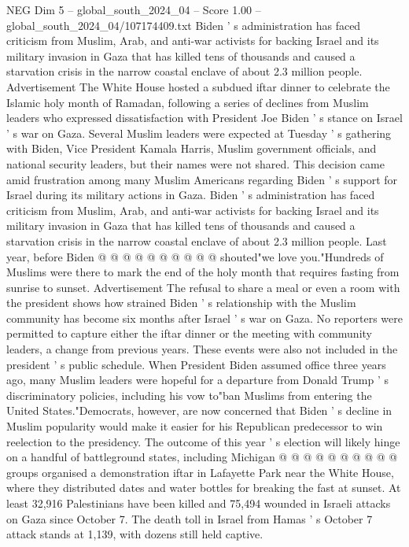 \begin{textsample}{NEG Dim 5 – global\_south\_2024\_04 – Score 1.00 – global\_south\_2024\_04/107174409.txt}  \label{ex:f5_neg_118}
Biden ' s administration has faced criticism from Muslim, Arab, and anti-war activists for backing Israel and its military invasion in Gaza that has killed tens of thousands and caused a starvation crisis in the narrow coastal enclave of about 2.3 million people.
Advertisement The White House hosted a subdued iftar dinner to celebrate the Islamic holy month of Ramadan, following a series of declines from Muslim leaders who expressed dissatisfaction with President Joe Biden ' s stance on Israel ' s war on Gaza.
Several Muslim leaders were expected at Tuesday ' s gathering with Biden, Vice President Kamala Harris, Muslim government officials, and national security leaders, but their names were not shared.
This decision came amid frustration among many Muslim Americans regarding Biden ' s support for Israel during its military actions in Gaza.
Biden ' s administration has faced criticism from Muslim, Arab, and anti-war activists for backing Israel and its military invasion in Gaza that has killed tens of thousands and caused a starvation crisis in the narrow coastal enclave of about 2.3 million people.
Last year, before Biden @ @ @ @ @ @ @ @ @ @ shouted"we love you."Hundreds of Muslims were there to mark the end of the holy month that requires fasting from sunrise to sunset.
Advertisement The refusal to share a meal or even a room with the president shows how strained Biden ' s relationship with the Muslim community has become six months after Israel ' s war on Gaza.
No reporters were permitted to capture either the iftar dinner or the meeting with community leaders, a change from previous years.
These events were also not included in the president ' s public schedule.
When President Biden assumed office three years ago, many Muslim leaders were hopeful for a departure from Donald Trump ' s discriminatory policies, including his vow to"ban Muslims from entering the United States."Democrats, however, are now concerned that Biden ' s decline in Muslim popularity would make it easier for his Republican predecessor to win reelection to the presidency.
The outcome of this year ' s election will likely hinge on a handful of battleground states, including Michigan @ @ @ @ @ @ @ @ @ @ groups organised a demonstration iftar in Lafayette Park near the White House, where they distributed dates and water bottles for breaking the fast at sunset.
At least 32,916 Palestinians have been killed and 75,494 wounded in Israeli attacks on Gaza since October 7.
The death toll in Israel from Hamas ' s October 7 attack stands at 1,139, with dozens still held captive.

\end{textsample}
